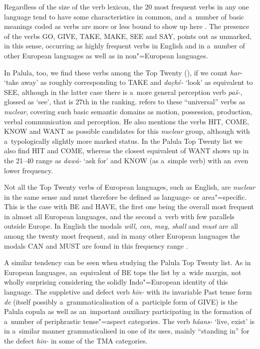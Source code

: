 Regardless of the size of the verb lexicon, the 20 most frequent verbs in any one language tend to have some characteristics in common, and a~number of basic meanings coded as verbs are more or less bound to show up here \citep[209]{viberg2006}. The presence of the verbs GO, GIVE, TAKE, MAKE, SEE and SAY, \citet[247]{viberg1993} points out as unmarked, in this sense, occurring as highly frequent verbs in English and in a~number of other European languages as well as in non"=European languages. 



In Palula, too, we find these verbs among the Top Twenty (), if we count \textit{har-} `take away' as roughly corresponding to TAKE and \textit{dac̣hé-} `look' as equivalent to SEE, although in the latter case there is a~more general perception verb \textit{paš-}, glossed as `see', that is 27th in the ranking. \citet[409]{viberg2006} refers to these ``universal'' verbs as \textit{nuclear}, covering such basic semantic domains as motion, possession, production, verbal communication and perception. He also mentions the verbs HIT, COME, KNOW and WANT as possible candidates for this \textit{nuclear} group, although with a~typologically slightly more marked status. In the Palula Top Twenty list we also find HIT and COME, whereas the closest equivalent of WANT shows up in the 21--40 range as \textit{dawá-} `ask for' and KNOW (as a~simple verb) with an~even lower frequency.



Not all the Top Twenty verbs of European languages, such as English, are \textit{nuclear} in the same sense and must therefore be defined as language- or area"=specific. This is the case with BE and HAVE, the first one being the overall most frequent in almost all European languages, and the second a~verb with few parallels outside Europe. In English the modals \textit{will, can, may, shall} and \textit{must} are all among the twenty most frequent, and in many other European languages the modals CAN and MUST are found in this frequency range \citep[346--349]{viberg1993}. 



A similar tendency can be seen when studying the Palula Top Twenty list. As in European languages,
an~equivalent of BE tops the list by a~wide margin, not wholly surprising considering the solidly
Indo"=European identity of this language. The suppletive and defect verb \textit{hin-} with its invariable Past tense form \textit{de} (itself possibly a~grammaticalisation of a~participle form of GIVE) is the Palula copula as well as an~important auxiliary participating in the formation of a~number of periphrastic tense"=aspect categories. The verb \textit{háans-} `live, exist' is in a~similar manner grammaticalised in one of its uses, mainly ``standing in'' for the defect \textit{hin-} in some of the TMA categories.


